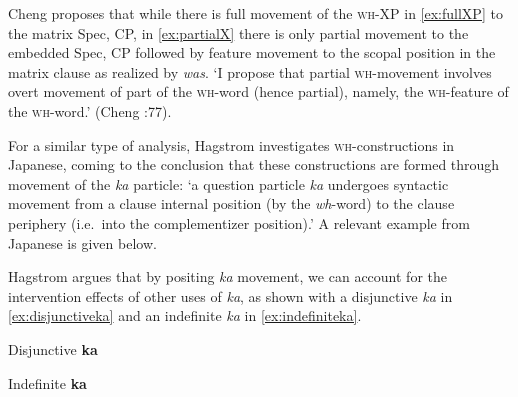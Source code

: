 \documentclass[output=paper,colorlinks,citecolor=brown,
]{langscibook}
\begin{document}
Cheng proposes that while there is full movement of the \textsc{wh}-XP in \ref{ex:fullXP} to the matrix Spec, CP, in \ref{ex:partialX} there is only partial movement to the embedded Spec, CP followed by feature movement to the scopal position in the matrix clause as realized by \textit{was}.  `I propose that partial \textsc{wh}-movement involves overt movement of part of the \textsc{wh}-word (hence partial), namely, the \textsc{wh}-feature of the \textsc{wh}-word.' (Cheng \citeyear{Cheng:2000b}:77).

For a similar type of analysis, Hagstrom \citeyearpar{Hagstrom:2000} investigates \textsc{wh}-constructions in Japanese, coming to the conclusion that these constructions are formed through movement of the \textit{ka} particle: `a question particle \textit{ka} undergoes syntactic movement from a clause internal position (by the  \textit{wh}-word) to the clause periphery (i.e.\ into the complementizer position).'
A relevant example from Japanese is given below.

\z

Hagstrom argues that by positing \textit{ka} movement, we can account for the intervention effects of other uses of \textit{ka}, as shown with a disjunctive  \textit{ka} in \ref{ex:disjunctiveka} and an indefinite  \textit{ka} in \ref{ex:indefiniteka}.

\ea Disjunctive \textbf{ka} \label{ex:disjunctiveka}
\z
\z

\ea Indefinite \textbf{ka} \label{ex:indefiniteka}
\z
\z
\end{document}
